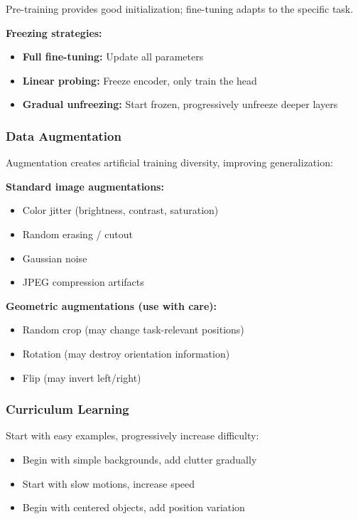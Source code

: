 Pre-training provides good initialization; fine-tuning adapts to the specific task.

\textbf{Freezing strategies:}
\begin{itemize}
    \item \textbf{Full fine-tuning:} Update all parameters
    \item \textbf{Linear probing:} Freeze encoder, only train the head
    \item \textbf{Gradual unfreezing:} Start frozen, progressively unfreeze deeper layers
\end{itemize}

\subsubsection{Data Augmentation}

Augmentation creates artificial training diversity, improving generalization:

\textbf{Standard image augmentations:}
\begin{itemize}
    \item Color jitter (brightness, contrast, saturation)
    \item Random erasing / cutout
    \item Gaussian noise
    \item JPEG compression artifacts
\end{itemize}

\textbf{Geometric augmentations (use with care):}
\begin{itemize}
    \item Random crop (may change task-relevant positions)
    \item Rotation (may destroy orientation information)
    \item Flip (may invert left/right)
\end{itemize}


\subsubsection{Curriculum Learning}

Start with easy examples, progressively increase difficulty:
\begin{itemize}
    \item Begin with simple backgrounds, add clutter gradually
    \item Start with slow motions, increase speed
    \item Begin with centered objects, add position variation
\end{itemize}

